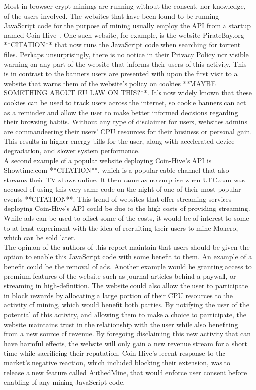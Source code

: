 Most in-browser crypt-minings are running without the consent, nor knowledge, of the users involved. The websites that have been found to be running JavaScript code for the purpose of mining usually employ the API from a startup named Coin-Hive~\cite{coinhive}. One such website, for example, is the website PirateBay.org **CITATION** that now runs the JavaScript code when searching for torrent files. Perhaps unsurprisingly, there is no notice in their Privacy Policy nor visible warning on any part of the website that informs their users of this activity. This is in contrast to the banners users are presented with upon the first visit to a website that warns them of the website’s policy on cookies **MAYBE SOMETHING ABOUT EU LAW ON THIS?**. It’s now widely known that these cookies can be used to track users across the internet, so cookie banners can act as a reminder and allow the user to make better informed decisions regarding their browsing habits. Without any type of disclaimer for users, websites admins are commandeering their users’ CPU resources for their business or personal gain. This results in higher energy bills for the user, along with accelerated device degradation, and slower system performance.
\\
A second example of a popular website deploying Coin-Hive’s API is Showtime.com **CITATION**, which is a popular cable channel that also streams their TV shows online. It then came as no surprise when UFC.com was accused of using this very same code on the night of one of their most popular events **CITATION**. This trend of websites that offer streaming services deploying Coin-Hive’s API could be due to the high costs of providing streaming. While ads can be used to offset some of the costs, it would be of interest to some to at least experiment with the idea of recruiting their users to mine Monero, which can be sold later.
\\
The opinion of the authors of this report maintain that users should be given the option to enable this JavaScript code with some benefit to them.  An example of a benefit could be the removal of ads. Another example would be granting access to premium features of the website such as journal articles behind a paywall, or streaming in high-definition. The website could also allow the user to participate in block rewards by allocating a large portion of their CPU resources to the activity of mining, which would benefit both parties. By notifying the user of the potential of this activity, and allowing them to make a choice to participate, the website maintains trust in the relationship with the user while also benefiting from a new source of revenue. By foregoing disclaiming this new activity that can have harmful effects, the website will only gain a new revenue stream for a short time while sacrificing their reputation. Coin-Hive’s recent response to the market’s negative reaction, which included blocking their extension, was to release a new feature called AuthedMine, that would enforce user consent before enabling of any mining JavaScript code. 
